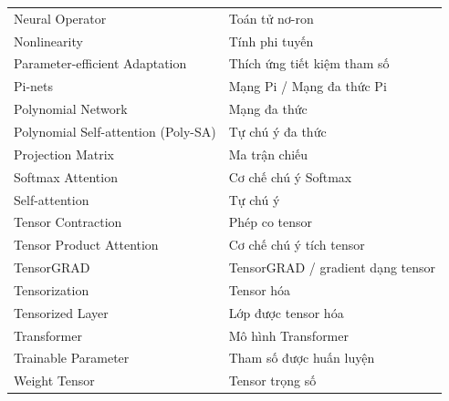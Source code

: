 \begin{longtable}{L{0.42\textwidth}L{0.48\textwidth}}
Neural Operator & Toán tử nơ-ron \\
Nonlinearity & Tính phi tuyến \\
Parameter-efficient Adaptation & Thích ứng tiết kiệm tham số \\
Pi-nets & Mạng Pi / Mạng đa thức Pi \\
Polynomial Network & Mạng đa thức \\
Polynomial Self-attention (Poly-SA) & Tự chú ý đa thức \\
Projection Matrix & Ma trận chiếu \\
Softmax Attention & Cơ chế chú ý Softmax \\
Self-attention & Tự chú ý \\
Tensor Contraction & Phép co tensor \\
Tensor Product Attention & Cơ chế chú ý tích tensor \\
TensorGRAD & TensorGRAD / gradient dạng tensor \\
Tensorization & Tensor hóa \\
Tensorized Layer & Lớp được tensor hóa \\
Transformer & Mô hình Transformer \\
Trainable Parameter & Tham số được huấn luyện \\
Weight Tensor & Tensor trọng số \\


\end{longtable}
